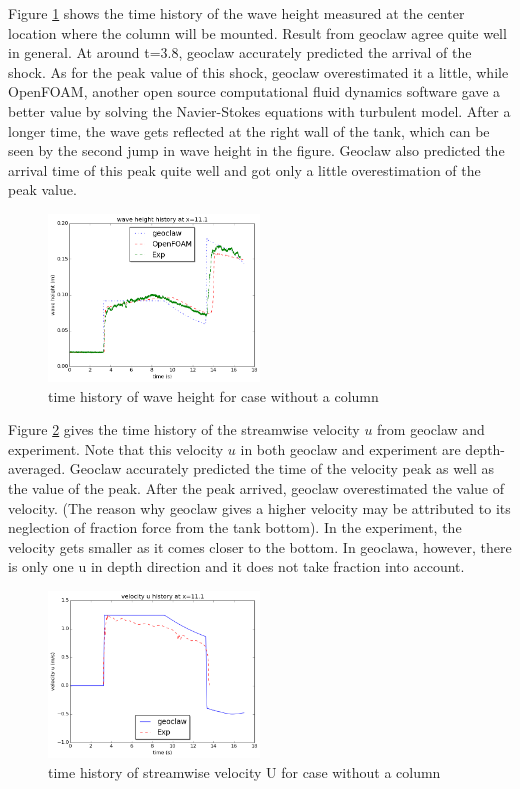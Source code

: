 \documentclass[11pt]{article}
\begin{document}
Figure \ref{fig:waveheight_nocolumn} shows the time history of the wave height measured at the center location where the column will be mounted. 
Result from geoclaw agree quite well in general. At around t=3.8, geoclaw accurately predicted the arrival of the shock. 
As for the peak value of this shock, geoclaw overestimated it a little, while OpenFOAM, another open source computational fluid dynamics software gave a better value by solving the Navier-Stokes equations with turbulent model.
After a longer time, the wave gets reflected at the right wall of the tank, which can be seen by the second jump in wave height in the figure. 
Geoclaw also predicted the arrival time of this peak quite well and got only a little overestimation of the peak value.
\begin{figure}[h!]
    \centering
    \includegraphics[width=0.5\textwidth]{../../dambreak/myplot/waveheight_nocolumn}
    \caption{time history of wave height for case without a column}
    \label{fig:waveheight_nocolumn}
\end{figure}

Figure \ref{fig:velocityU_nocolumn} gives the time history of the streamwise velocity $u$ from geoclaw and experiment. 
Note that this velocity $u$ in both geoclaw and experiment are depth-averaged. 
Geoclaw accurately predicted the time of the velocity peak as well as the value of the peak. 
After the peak arrived, geoclaw overestimated the value of velocity.
(The reason why geoclaw gives a higher velocity may be attributed to its neglection of fraction force from the tank bottom). In the experiment, the velocity gets smaller as it comes closer to the bottom. 
In geoclawa, however, there is only one u in depth direction and it does not take fraction into account. 
\begin{figure}[h!]
    \centering
    \includegraphics[width=0.5\textwidth]{../../dambreak/myplot/velocityU_nocolumn}
    \caption{time history of streamwise velocity U for case without a column}
    \label{fig:velocityU_nocolumn}
\end{figure}
\end{document}
